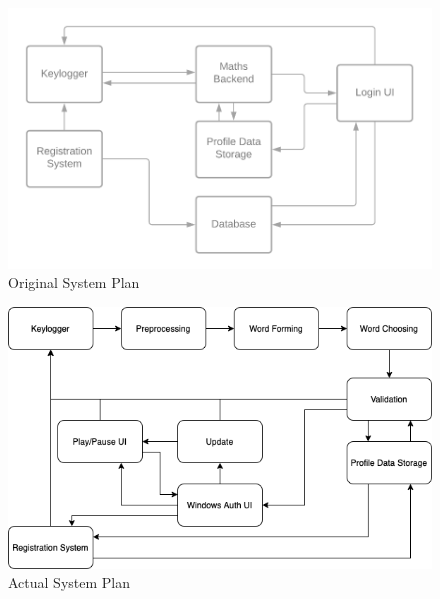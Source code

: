 \documentclass[10pt,a4paper]{report}
\begin{document}
\begin{figure}
	\includegraphics[scale=0.7]{OldPlan}
	\caption{Original System Plan}
	\label{fig:OldPlan}
\end{figure}

\begin{figure}
	\includegraphics[scale=0.55]{SystemPlan}
	\caption{Actual System Plan}
	\label{fig:NewPlan}
\end{figure}
\end{document}
